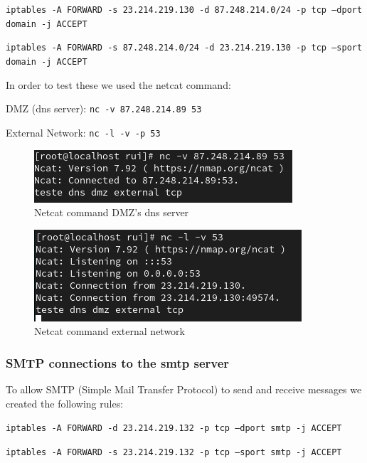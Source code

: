 \documentclass{article}
\begin{document}
\texttt{}\par
\texttt{iptables -A FORWARD -s 23.214.219.130 -d 87.248.214.0/24 -p tcp --dport domain -j ACCEPT}\par
\texttt{iptables -A FORWARD -s 87.248.214.0/24 -d 23.214.219.130 -p tcp --sport domain -j ACCEPT}\par
\texttt{}\par

In order to test these we used the netcat command:
\texttt{}\par
\texttt{}\par
DMZ (dns server): \texttt{nc -v 87.248.214.89 53} \par
External Network: \texttt{nc -l -v -p 53} \par
\texttt{}\par
\begin{figure}[H]
    \centering
    \includegraphics[scale=0.5]{btw/btw_dns_external_tcp_dmz.png}
    \caption{Netcat command DMZ's dns server}
    \label{fig:network-arc}
\end{figure}

\begin{figure}[H]
    \centering
    \includegraphics[scale=0.5]{btw/btw_dns_external_tcp_external.png}
    \caption{Netcat command external network}
    \label{fig:network-arc}
\end{figure}


\subsubsection{SMTP connections to the smtp server}

\quad To allow SMTP (Simple Mail Transfer Protocol) to send and receive messages we created the following rules:

\texttt{}\par
\texttt{iptables -A FORWARD -d 23.214.219.132 -p tcp --dport smtp -j ACCEPT}\par
\texttt{iptables -A FORWARD -s 23.214.219.132 -p tcp --sport smtp -j ACCEPT}\par
\texttt{}\par
\end{document}
